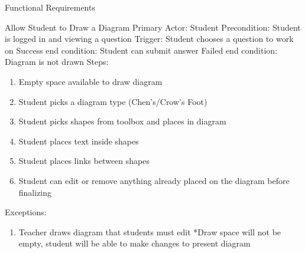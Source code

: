 \documentclass{article}
\begin{document}
\newpage
\begin{section}{Functional Requirements}

    \begin{subsection}{Allow Student to Draw a Diagram}
    Primary Actor: Student \newline
    Precondition: Student is logged in and viewing a            question \newline
    Trigger: Student chooses a question to work on \newline
    Success end condition: Student can submit answer            \newline
    Failed end condition: Diagram is not drawn \newline
    \newline
    Steps:
    \begin{enumerate}
    \item{Empty space available to draw diagram}
    \item{Student picks a diagram type (Chen’s/Crow’s Foot)}
    \item{Student picks shapes from toolbox and places in           diagram}
    \item{Student places text inside shapes}
    \item{Student places links between shapes}
    \item{Student can edit or remove anything already placed on the diagram before finalizing}
    \end{enumerate}
    Exceptions:
    \begin{enumerate}
    \item{Teacher draws diagram that students must edit             \newline
        *Draw space will not be empty, student will be able to           make changes to present diagram}
    \end{enumerate}
    \end{subsection}
    

\end{section}
\end{document}
